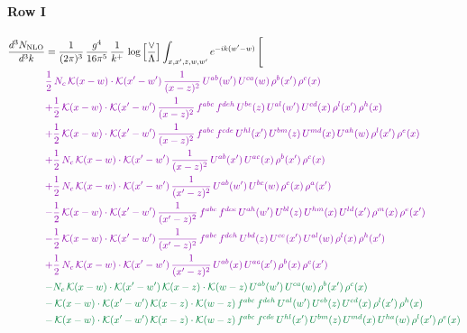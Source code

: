 \documentclass[10pt]{article}
\numberwithin{equation}{section}
\begin{document}
\paragraph{Row I}
\begin{align}
\frac{d^{3}N_{\mathrm{NLO}}}{d^{3}k} & = \frac{1}{(2\pi)^{3}}\,\frac{g^{4}}{16\pi^{5}}\,\frac{1}{k^{+}}\,\log\Big[\frac{\vee}{\Lambda}\Big]\int_{x,x',z,w,w'}e^{-ik(w'-w)}\,\Bigg[\notag\\ &{\color{CC} \frac{1}{2}\,N_{c}\,\mathcal{K}(x-w)\cdot\mathcal{K}(x'-w')\,\frac{1}{(x-z)^{2}}\,U^{ab}(w')\,U^{ca}(w)\,\rho^{b}(x')\,\rho^{c}(x)} \notag\\
&{\color{CC} +\frac{1}{2}\,\mathcal{K}(x-w)\cdot\mathcal{K}(x'-w')\,\frac{1}{(x-z)^{2}}\,f^{abc}\,f^{deh}\,U^{be}(z)\,U^{al}(w')\,U^{cd}(x)\,\rho^{l}(x')\,\rho^{h}(x)} \notag\\
&{\color{CC} +\frac{1}{2}\,\mathcal{K}(x-w)\cdot\mathcal{K}(x'-w')\,\frac{1}{(x-z)^{2}}\,f^{abc}\,f^{cde}\,U^{hl}(x')\,U^{bm}(z)\,U^{md}(x)\,U^{ah}(w)\,\rho^{l}(x')\,\rho^{e}(x)} \notag\\
&{\color{CC} +\frac{1}{2}\,N_{c}\,\mathcal{K}(x-w)\cdot\mathcal{K}(x'-w')\,\frac{1}{(x-z)^{2}}\,U^{ab}(x')\,U^{ac}(x)\,\rho^{b}(x')\,\rho^{c}(x)} \notag\\
&{\color{CC} +\frac{1}{2}\,N_{c}\,\mathcal{K}(x-w)\cdot\mathcal{K}(x'-w')\,\frac{1}{(x'-z)^{2}}\,U^{ab}(w')\,U^{bc}(w)\,\rho^{c}(x)\,\rho^{a}(x')} \notag\\
&{\color{CC} -\frac{1}{2}\,\mathcal{K}(x-w)\cdot\mathcal{K}(x'-w')\,\frac{1}{(x'-z)^{2}}\,f^{abc}\,f^{dce}\,U^{ah}(w')\,U^{bl}(z)\,U^{hm}(x)\,U^{ld}(x')\,\rho^{m}(x)\,\rho^{e}(x')} \notag\\
&{\color{CC} -\frac{1}{2}\,\mathcal{K}(x-w)\cdot\mathcal{K}(x'-w')\,\frac{1}{(x'-z)^{2}}\,f^{abc}\,f^{deh}\,U^{bd}(z)\,U^{ce}(x')\,U^{al}(w)\,\rho^{l}(x)\,\rho^{h}(x')} \notag\\
&{\color{CC} +\frac{1}{2}\,N_{c}\,\mathcal{K}(x-w)\cdot\mathcal{K}(x'-w')\,\frac{1}{(x'-z)^{2}}\,U^{ab}(x)\,U^{ac}(x')\,\rho^{b}(x)\,\rho^{c}(x')} \notag\\
&{\color{JIM} -N_{c}\,\mathcal{K}(x-w)\cdot\mathcal{K}(x'-w')\,\mathcal{K}(x-z)\cdot\mathcal{K}(w-z)\,U^{ab}(w')\,U^{ca}(w)\,\rho^{b}(x')\,\rho^{c}(x)} \notag\\
&{\color{JIM} -\,\mathcal{K}(x-w)\cdot\mathcal{K}(x'-w')\,\mathcal{K}(x-z)\cdot\mathcal{K}(w-z)\,f^{abc}\,f^{deh}\,U^{al}(w')\,U^{eb}(z)\,U^{cd}(x)\,\rho^{l}(x')\,\rho^{h}(x)} \notag\\
&{\color{JIM} -\,\mathcal{K}(x-w)\cdot\mathcal{K}(x'-w')\,\mathcal{K}(x-z)\cdot\mathcal{K}(w-z)\,f^{abc}\,f^{cde}\,U^{hl}(x')\,U^{bm}(z)\,U^{md}(x)\,U^{ha}(w)\,\rho^{l}(x')\,\rho^{e}(x)} \notag\\

\end{align}
\end{document}
